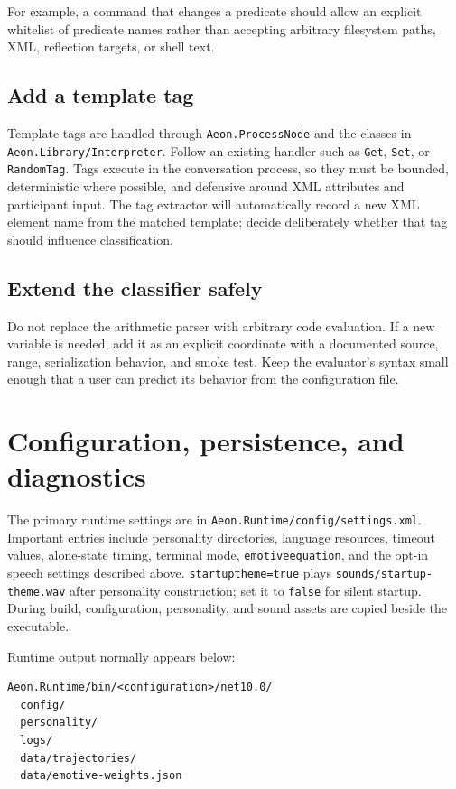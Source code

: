 \documentclass[11pt,a4paper]{article}
\begin{document}
For example, a command that changes a predicate should allow an explicit whitelist of predicate names rather than accepting arbitrary filesystem paths, XML, reflection targets, or shell text.

\subsection{Add a template tag}

Template tags are handled through \texttt{Aeon.ProcessNode} and the classes in \texttt{Aeon.Library/Interpreter}. Follow an existing handler such as \texttt{Get}, \texttt{Set}, or \texttt{RandomTag}. Tags execute in the conversation process, so they must be bounded, deterministic where possible, and defensive around XML attributes and participant input. The tag extractor will automatically record a new XML element name from the matched template; decide deliberately whether that tag should influence classification.

\subsection{Extend the classifier safely}

Do not replace the arithmetic parser with arbitrary code evaluation. If a new variable is needed, add it as an explicit coordinate with a documented source, range, serialization behavior, and smoke test. Keep the evaluator's syntax small enough that a user can predict its behavior from the configuration file.

\section{Configuration, persistence, and diagnostics}

The primary runtime settings are in \texttt{Aeon.Runtime/config/settings.xml}. Important entries include personality directories, language resources, timeout values, alone-state timing, terminal mode, \texttt{emotiveequation}, and the opt-in speech settings described above. \texttt{startuptheme=true} plays \texttt{sounds/startup-theme.wav} after personality construction; set it to \texttt{false} for silent startup. During build, configuration, personality, and sound assets are copied beside the executable.

Runtime output normally appears below:

\begin{minipage}{\linewidth}
\begin{lstlisting}
Aeon.Runtime/bin/<configuration>/net10.0/
  config/
  personality/
  logs/
  data/trajectories/
  data/emotive-weights.json
\end{lstlisting}
\end{minipage}
\end{document}
